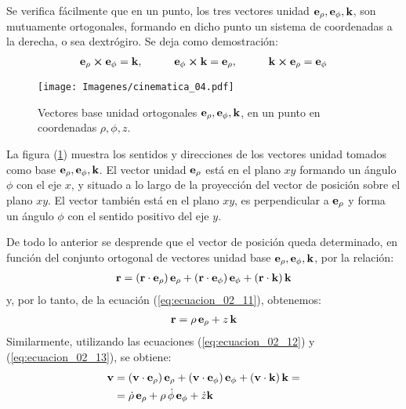 \documentclass[12pt]{article}
\begin{document}
Se verifica fácilmente que en un punto, los tres vectores unidad $\vb{e}_{\rho}, \vb{e}_{\phi}, \vb{k}$, son mutuamente ortogonales, formando en dicho punto un sistema de coordenadas a la derecha, o sea dextrógiro. Se deja como demostración:
\begin{align}
\vb{e}_{\rho} \cp \vb{e}_{\phi} = \vb{k}, \hspace{1cm} \vb{e}_{\phi} \cp \vb{k} = \vb{e}_{\rho}, \hspace{1cm} \vb{k} \cp \vb{e}_{\rho} = \vb{e}_{\phi}
\label{eq:ecuacion_02_16}
\end{align}
\begin{figure}[H]
    \centering
    \texttt{[image: Imagenes/cinematica\_04.pdf]}
    \caption{Vectores base unidad ortogonales $\vb{e}_{\rho}, \vb{e}_{\phi}, \vb{k}$, en un punto en coordenadas $\rho, \phi, z$.}
    \label{fig:figura_02_04}    
\end{figure}
La figura (\ref{fig:figura_02_04}) muestra los sentidos y direcciones de los vectores unidad tomados como base $\vb{e}_{\rho}, \vb{e}_{\phi}, \vb{k}$. El vector unidad $\vb{e}_{\rho}$ está en el plano $x y$ formando un ángulo $\phi$ con el eje $x$, y situado a lo largo de la proyección del vector de posición sobre el plano $x y$. El vector también está en el plano $x y$, es perpendicular a $\vb{e}_{\rho}$ y forma un ángulo $\phi$ con el sentido positivo del eje $y$. 
\par
De todo lo anterior se desprende que el vector de posición queda determinado, en función del conjunto ortogonal de vectores unidad base $\vb{e}_{\rho}, \vb{e}_{\phi}, \vb{k}$, por la relación:
\begin{align*}
\vb{r} = \left( \vb{r} \cdot \vb{e}_{\rho} \right) \vb{e}_{\rho} + \left( \vb{r} \cdot \vb{e}_{\phi} \right) \vb{e}_{\phi} + \left( \vb{r} \cdot \vb{k} \right) \vb{k}
\end{align*}
y, por lo tanto, de la ecuación (\ref{eq:ecuacion_02_11}), obtenemos:
\begin{align}
\vb{r} = \rho \, \vb{e}_{\rho} +  z \, \vb{k}
\label{eq:ecuacion_02_17}
\end{align}
Similarmente, utilizando las ecuaciones (\ref{eq:ecuacion_02_12}) y (\ref{eq:ecuacion_02_13}), se obtiene:
\begin{align}
\begin{aligned}
\vb{v} &= \left( \vb{v} \cdot \vb{e}_{\rho} \right) \vb{e}_{\rho} + \left( \vb{v} \cdot \vb{e}_{\phi} \right) \vb{e}_{\phi} + \left( \vb{v} \cdot \vb{k} \right) \vb{k} = \\
&= \dot{\rho} \, \vb{e}_{\rho} + \rho \, \dot{\phi} \, \vb{e}_{\phi} + \dot{z} \vb{k}
\end{aligned}
\label{eq:ecuacion_02_18}
\end{align}
\end{document}
